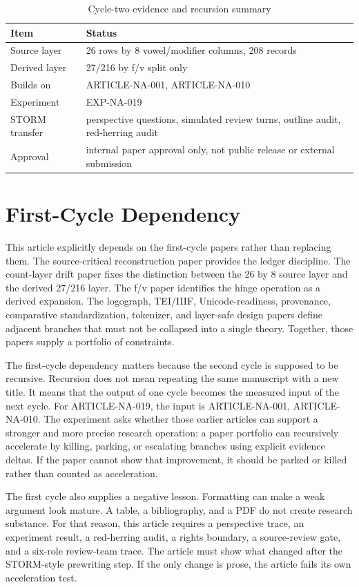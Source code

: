 \documentclass[sigconf,nonacm]{acmart}
\begin{document}
\begin{table}[t]
\caption{Cycle-two evidence and recursion summary}
\label{tab:cycle2}
\begin{tabular}{p{}p{}}
\toprule
Item & Status \\
\midrule
Source layer & 26 rows by 8 vowel/modifier columns, 208 records \\
Derived layer & 27/216 by f/v split only \\
Builds on & ARTICLE-NA-001, ARTICLE-NA-010 \\
Experiment & EXP-NA-019 \\
STORM transfer & perspective questions, simulated review turns, outline audit, red-herring audit \\
Approval & internal paper approval only, not public release or external submission \\
\bottomrule
\end{tabular}
\end{table}


\section{First-Cycle Dependency}
This article explicitly depends on the first-cycle papers rather than replacing
them. The source-critical reconstruction paper provides the ledger discipline.
The count-layer drift paper fixes the distinction between the 26 by 8 source
layer and the derived 27/216 layer. The f/v paper identifies the hinge operation
as a derived expansion. The logograph, TEI/IIIF, Unicode-readiness, provenance,
comparative standardization, tokenizer, and layer-safe design papers define
adjacent branches that must not be collapsed into a single theory. Together,
those papers supply a portfolio of constraints.

The first-cycle dependency matters because the second cycle is supposed to be
recursive. Recursion does not mean repeating the same manuscript with a new
title. It means that the output of one cycle becomes the measured input of the
next cycle. For ARTICLE-NA-019, the input is ARTICLE-NA-001, ARTICLE-NA-010. The experiment asks
whether those earlier articles can support a stronger and more precise research
operation: a paper portfolio can recursively accelerate by killing, parking, or escalating branches using explicit evidence deltas. If the paper cannot show that improvement, it should be
parked or killed rather than counted as acceleration.

The first cycle also supplies a negative lesson. Formatting can make a weak
argument look mature. A table, a bibliography, and a PDF do not create research
substance. For that reason, this article requires a perspective trace, an
experiment result, a red-herring audit, a rights boundary, a source-review gate,
and a six-role review-team trace. The article must show what changed after the
STORM-style prewriting step. If the only change is prose, the article fails its
own acceleration test.
\end{document}
